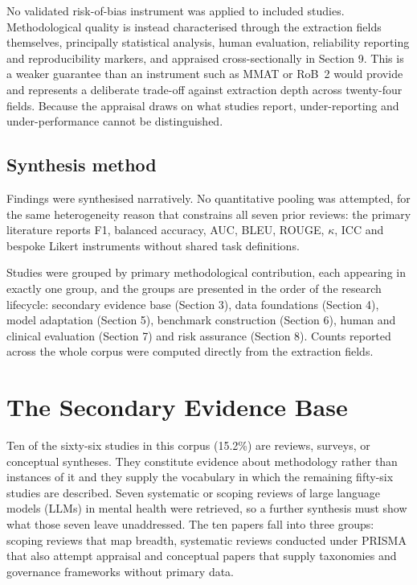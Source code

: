 \documentclass[11pt]{article}
\begin{document}
	No validated risk-of-bias instrument was applied to included studies. Methodological quality is
	instead characterised through the extraction fields themselves, principally statistical analysis,
	human evaluation, reliability reporting and reproducibility markers, and appraised cross-sectionally
	in Section 9. This is a weaker guarantee than an instrument such as MMAT or RoB~2 would provide and
	represents a deliberate trade-off against extraction depth across twenty-four fields. Because the
	appraisal draws on what studies report, under-reporting and under-performance cannot be
	distinguished.
	
	\subsection{Synthesis method}
	
	Findings were synthesised narratively. No quantitative pooling was attempted, for the same
	heterogeneity reason that constrains all seven prior reviews: the primary literature reports F1,
	balanced accuracy, AUC, BLEU, ROUGE, $\kappa$, ICC and bespoke Likert instruments without shared
	task definitions.
	
	Studies were grouped by primary methodological contribution, each appearing in exactly one group,
	and the groups are presented in the order of the research lifecycle: secondary evidence base
	(Section 3), data foundations (Section 4), model adaptation (Section 5), benchmark construction
	(Section 6), human and clinical evaluation (Section 7) and risk assurance (Section 8). Counts
	reported across the whole corpus were computed directly from the extraction fields.
	
	
	
	\section{The Secondary Evidence Base}
	
	Ten of the sixty-six studies in this corpus (15.2\%) are reviews, surveys, or conceptual syntheses. They constitute evidence about methodology rather than instances of it and they supply the vocabulary in which the remaining fifty-six studies are described. Seven systematic or scoping reviews of large language models (LLMs) in mental health were retrieved, so a further synthesis must show what those seven leave unaddressed. The ten papers fall into three groups: scoping reviews that map breadth, systematic reviews conducted under PRISMA that also attempt appraisal and conceptual papers that supply taxonomies and governance frameworks without primary data.
	
\end{document}
